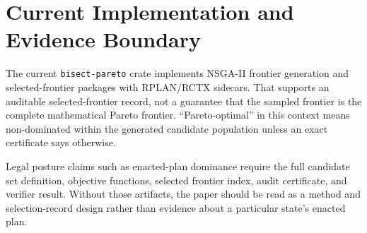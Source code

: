 \section{Current Implementation and Evidence Boundary}

The current \texttt{bisect-pareto} crate implements NSGA-II frontier generation
and selected-frontier packages with RPLAN/RCTX sidecars.  That supports an
auditable selected-frontier record, not a guarantee that the sampled frontier is
the complete mathematical Pareto frontier.  ``Pareto-optimal'' in this context
means non-dominated within the generated candidate population unless an exact
certificate says otherwise.

Legal posture claims such as enacted-plan dominance require the full candidate
set definition, objective functions, selected frontier index, audit certificate,
and verifier result.  Without those artifacts, the paper should be read as a
method and selection-record design rather than evidence about a particular
state's enacted plan.
